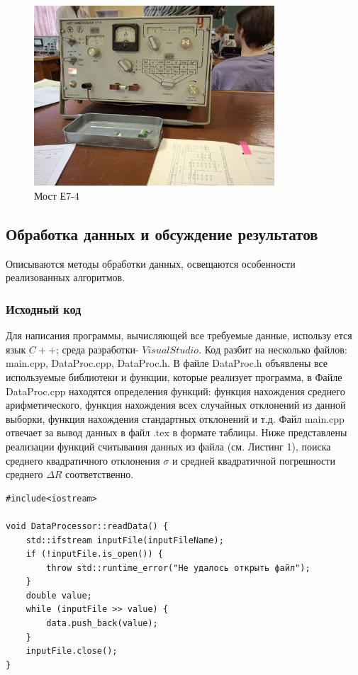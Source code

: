 \begin{figure}[ht!]
\centering
\includegraphics[width=0.8\textwidth]{device}
\caption{Мост Е7-4}
\label{fig:device}
\end{figure}
\newpage
\subsection{Обработка данных и обсуждение результатов}
Описываются методы обработки данных, освещаются особенности реализованных алгоритмов.

\subsubsection{Исходный код}
Для написания программы, вычисляющей все требуемые данные, использу
ется язык $C++$; среда разработки- $Visual Studio$.
 Код разбит на несколько файлов: main.cpp, DataProc.cpp, DataProc.h.
 В файле DataProc.h объявлены все используемые библиотеки и функции, которые реализует программа, в Файле DataProc.cpp находятся определения функций: функция нахождения среднего арифметического, функция нахождения всех случайных отклонений из данной выборки, функция нахождения стандартных отклонений и т.д. 
 Файл main.cpp отвечает за вывод данных в файл .tex в формате таблицы.
 Ниже представлены реализации функций считывания данных из файла (см. Листинг 1), поиска среднего квадратичного отклонения $\sigma$ и средней квадратичной погрешности среднего $\Delta R$ соответственно.
\newpage
\begin{lstlisting}[label=listing1, caption=Считывание данных их файла]
#include<iostream>

void DataProcessor::readData() {
    std::ifstream inputFile(inputFileName);
    if (!inputFile.is_open()) {
        throw std::runtime_error("Не удалось открыть файл");
    }
    double value;
    while (inputFile >> value) {
        data.push_back(value);
    }
    inputFile.close();
}
\end{lstlisting}

